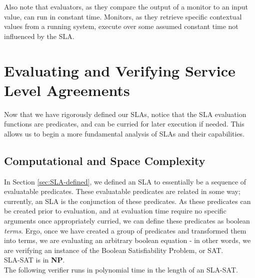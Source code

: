 Also note that evaluators, as they compare the output of a monitor to an input value, can run in constant time.  Monitors, as they retrieve specific contextual values from a running system, execute over some assumed constant time not influenced by the SLA.

\section{Evaluating and Verifying Service Level Agreements}\label{sec:SLA-analysis}
Now that we have rigorously defined our SLAs, notice that the SLA evaluation functions are predicates, and can be curried for later execution if needed.  This allows us to begin a more fundamental analysis of SLAs and their capabilities.

\subsection{Computational and Space Complexity}
In Section \ref{sec:SLA-defined}, we defined an SLA to essentially be a sequence of evaluatable predicates.  These evaluatable predicates are related in some way; currently, an SLA is the conjunction of these predicates.  As these predicates can be created prior to evaluation, and at evaluation time require no specific arguments once appropriately curried, we can define these predicates as boolean {\it terms}.  Ergo, once we have created a group of predicates and transformed them into terms, we are evaluating an arbitrary boolean equation - in other words, we are verifying an instance of the Boolean Satisfiability Problem, or SAT.\\

 SLA-SAT is in {\bf NP}.\\

 The following verifier runs in polynomial time in the length of an SLA-SAT.\\

